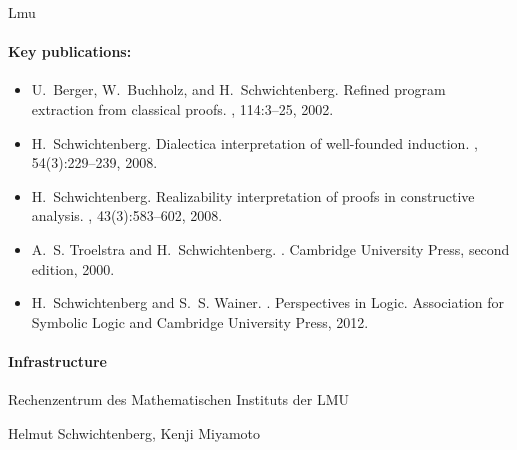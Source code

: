 \begin{sitedescription}{Lmu}
\begin{itemize}
\end{itemize}


\paragraph{Key publications:}

\begin{itemize}
\item U.~Berger, W.~Buchholz, and H.~Schwichtenberg.
\newblock Refined program extraction from classical proofs.
, 114:3--25, 2002.

\item H.~Schwichtenberg.
\newblock Dialectica interpretation of well-founded induction.
, 54(3):229--239, 2008.

\item H.~Schwichtenberg.
\newblock Realizability interpretation of proofs in constructive analysis.
, 43(3):583--602, 2008.

\item A.~S. Troelstra and H.~Schwichtenberg.
.
\newblock Cambridge University Press, second edition, 2000.

\item H.~Schwichtenberg and S.~S. Wainer.
.
\newblock Perspectives in Logic. Association for Symbolic Logic and Cambridge
  University Press, 2012.
\end{itemize}

\paragraph{Infrastructure}

Rechenzentrum des Mathematischen Instituts der LMU 


Helmut Schwichtenberg, Kenji Miyamoto

\end{sitedescription}

